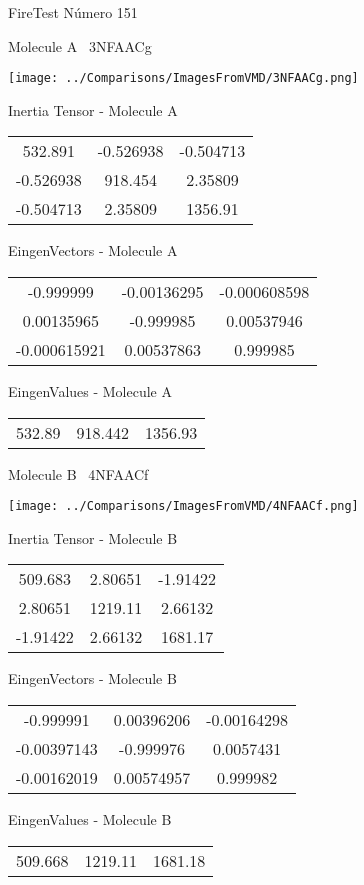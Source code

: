 \vtab[-3cm]
\begin{center}
{\large FireTest \tab Número 151}
\end{center}
\begin{multicols}{2}
\begin{center}

Molecule A \
3NFAACg

\texttt{[image: ../Comparisons/ImagesFromVMD/3NFAACg.png]}

Inertia Tensor - Molecule A \\
\begin{tabular}{|c c c|}
532.891	 & 	-0.526938	 & 	-0.504713	 \\
-0.526938	 & 	918.454	 & 	2.35809	 \\
-0.504713	 & 	2.35809	 & 	1356.91
\end{tabular}

\vtab
 EingenVectors - Molecule A     \\
\begin{tabular}{|c c c|}
-0.999999	 & 	-0.00136295	 & 	-0.000608598	 \\
0.00135965	 & 	-0.999985	 & 	0.00537946	 \\
-0.000615921	 & 	0.00537863	 & 	0.999985
\end{tabular}

\vtab
 EingenValues - Molecule A     \\
\begin{tabular}{|c c c|}
532.89	 & 	918.442	 & 	1356.93	 \\
\end{tabular}
\columnbreak

Molecule B \
4NFAACf

\texttt{[image: ../Comparisons/ImagesFromVMD/4NFAACf.png]}

Inertia Tensor - Molecule B \\
\begin{tabular}{|c c c|}
509.683	 & 	2.80651	 & 	-1.91422	 \\
2.80651	 & 	1219.11	 & 	2.66132	 \\
-1.91422	 & 	2.66132	 & 	1681.17
\end{tabular}

\vtab
 EingenVectors - Molecule B     \\
\begin{tabular}{|c c c|}
-0.999991	 & 	0.00396206	 & 	-0.00164298	 \\
-0.00397143	 & 	-0.999976	 & 	0.0057431	 \\
-0.00162019	 & 	0.00574957	 & 	0.999982
\end{tabular}

\vtab
 EingenValues - Molecule B     \\
\begin{tabular}{|c c c|}
509.668	 & 	1219.11	 & 	1681.18	 \\
\end{tabular}

\end{center}
\end{multicols}

